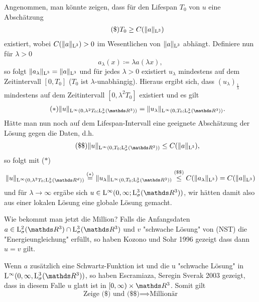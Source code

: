 Angenommen, man könnte zeigen, dass für den Lifespan $T_0$ von $u$ eine Abschätzung
\begin{align*}
  \tag{\$} T_0 \geq C(\|a\|_{\mathrm{L}^3})
\end{align*}
existiert, wobei $C(\|a\|_{\mathrm{L}^3}) > 0$ im Wesentlichen von $\|a\|_{\mathrm{L}^3}$ abhängt.
Definiere nun für $\lambda > 0$
$$
a_\lambda(x) \coloneqq \lambda a(\lambda x),
$$
so folgt $\|a_\lambda\|_{\mathrm{L}^3} = \|a\|_{\mathrm{L}^3}$ und für jedes $\lambda > 0$ existiert $u_\lambda$ mindestens auf dem Zeitintervall $[0,T_0]$ ($T_0$ ist $\lambda$-unabhängig).
Hieraus ergibt sich, dass $(u_\lambda)_{\frac{1}{\lambda}}$ mindestens auf dem Zeitintervall $[0,\lambda^2 T_0]$ existiert und es gilt
\begin{align*}
  \tag{$\ast$} \|u\|_{\Ell^\infty(0,\lambda^2 T_0; \Ell^3_\sigma(\R^3))} = \|u_\lambda\|_{\Ell^\infty(0,T_0; \Ell^3_\sigma(\R^3))}.
\end{align*} 
Hätte man nun noch auf dem Lifespan-Intervall eine geeignete Abschätzung der Lösung gegen die Daten, d.h.
\begin{align*}
  \tag{\$\$} \|u\|_{\Ell^\infty(0,T_0; \Ell^3_\sigma(\R^3))} \leq C(\|a\|_{\Ell^3}),
\end{align*}
so folgt mit ($\ast$)
$$
\|u\|_{\Ell^\infty(0,\lambda^2 T_0; \Ell^3_\sigma(\R^d))}
\overset{\text{($\ast$)}}{=} \|u_\lambda\|_{\Ell^\infty(0,T_0; \Ell^3_\sigma(\R^3))}
\overset{\text{(\$\$)}}{\leq} C(\|a_\lambda\|_{\Ell^3}) = C(\|a\|_{\Ell^3})
$$
und für $\lambda \to \infty$ ergäbe sich $u \in \Ell^\infty(0,\infty; \Ell^3_\sigma(\R^3))$, wir hätten damit also aus einer lokalen Lösung eine globale Lösung gemacht.

Wie bekommt man jetzt die Million?
Falls die Anfangsdaten $a \in \Ell^2_\sigma(\R^3) \cap \Ell^3_\sigma(\R^3)$ und $v$ "schwache Lösung" von (NST) die "Energieungleichung" erfüllt, so haben Kozono und Sohr 1996 gezeigt dass dann $u = v$ gilt.

Wenn $a$ zusätzlich eine Schwartz-Funktion ist und die u "schwache Lösung" in $\Ell^\infty(0,\infty,\Ell^3_\sigma(\R^3))$, so haben Escramiaza, Seregin Sverak 2003 gezeigt, dass in diesem Falle $u$ glatt ist in $[0,\infty) \times \R^3$. Somit gilt
$$
\text{Zeige (\$) und (\$\$)} \implies \text{Millionär}
$$

